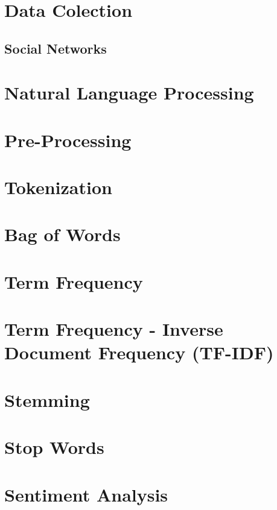 \section{Data Colection}
    \subsection{Social Networks}

\section{Natural Language Processing}

\section{Pre-Processing}

\section{Tokenization}

\section{Bag of Words}

\section{Term Frequency}

\section{Term Frequency - Inverse Document Frequency (TF-IDF)}

\section{Stemming}

\section{Stop Words}

\section{Sentiment Analysis}

